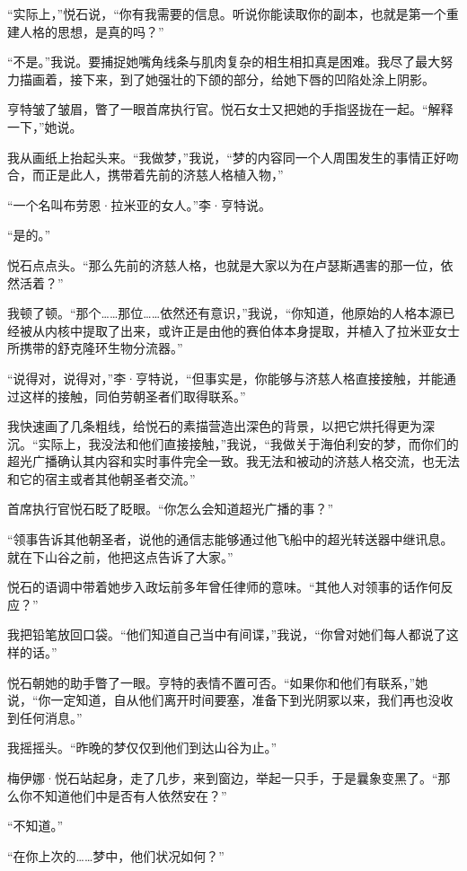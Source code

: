 \documentclass[AutoFakeBold=true]{book}
\begin{document}
``实际上，''悦石说，``你有我需要的信息。听说你能读取你的副本，也就是第一个重建人格的思想，是真的吗？''

``不是。''我说。要捕捉她嘴角线条与肌肉复杂的相生相扣真是困难。我尽了最大努力描画着，接下来，到了她强壮的下颌的部分，给她下唇的凹陷处涂上阴影。

亨特皱了皱眉，瞥了一眼首席执行官。悦石女士又把她的手指竖拢在一起。``解释一下，''她说。

我从画纸上抬起头来。``我做梦，''我说，``梦的内容同一个人周围发生的事情正好吻合，而正是此人，携带着先前的济慈人格植入物，''

``一个名叫布劳恩·拉米亚的女人。''李·亨特说。

``是的。''

悦石点点头。``那么先前的济慈人格，也就是大家以为在卢瑟斯遇害的那一位，依然活着？''

我顿了顿。``那个……那位……依然还有意识，''我说，``你知道，他原始的人格本源已经被从内核中提取了出来，或许正是由他的赛伯体本身提取，并植入了拉米亚女士所携带的舒克隆环生物分流器。''

``说得对，说得对，''李·亨特说，``但事实是，你能够与济慈人格直接接触，并能通过这样的接触，同伯劳朝圣者们取得联系。''

我快速画了几条粗线，给悦石的素描营造出深色的背景，以把它烘托得更为深沉。``实际上，我没法和他们直接接触，''我说，``我做关于海伯利安的梦，而你们的超光广播确认其内容和实时事件完全一致。我无法和被动的济慈人格交流，也无法和它的宿主或者其他朝圣者交流。''

首席执行官悦石眨了眨眼。``你怎么会知道超光广播的事？''

``领事告诉其他朝圣者，说他的通信志能够通过他飞船中的超光转送器中继讯息。就在下山谷之前，他把这点告诉了大家。''

悦石的语调中带着她步入政坛前多年曾任律师的意味。``其他人对领事的话作何反应？''

我把铅笔放回口袋。``他们知道自己当中有间谍，''我说，``你曾对她们每人都说了这样的话。''

悦石朝她的助手瞥了一眼。亨特的表情不置可否。``如果你和他们有联系，''她说，``你一定知道，自从他们离开时间要塞，准备下到光阴冢以来，我们再也没收到任何消息。''

我摇摇头。``昨晚的梦仅仅到他们到达山谷为止。''

梅伊娜·悦石站起身，走了几步，来到窗边，举起一只手，于是曩象变黑了。``那么你不知道他们中是否有人依然安在？''

``不知道。''

``在你上次的……梦中，他们状况如何？''
\end{document}
